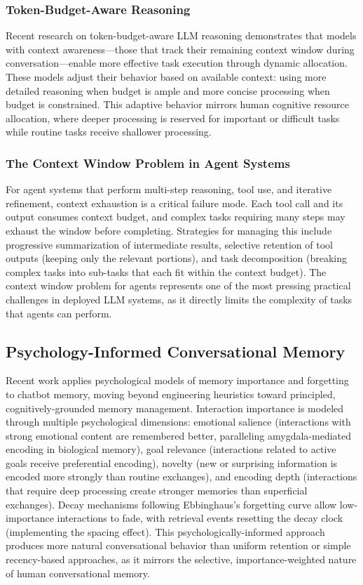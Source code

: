 \documentclass[11pt,letterpaper]{article}
\begin{document}
\subsubsection{Token-Budget-Aware Reasoning}

Recent research on token-budget-aware LLM reasoning demonstrates that models with context awareness---those that track their remaining context window during conversation---enable more effective task execution through dynamic allocation. These models adjust their behavior based on available context: using more detailed reasoning when budget is ample and more concise processing when budget is constrained. This adaptive behavior mirrors human cognitive resource allocation, where deeper processing is reserved for important or difficult tasks while routine tasks receive shallower processing.

\subsubsection{The Context Window Problem in Agent Systems}

For agent systems that perform multi-step reasoning, tool use, and iterative refinement, context exhaustion is a critical failure mode. Each tool call and its output consumes context budget, and complex tasks requiring many steps may exhaust the window before completing. Strategies for managing this include progressive summarization of intermediate results, selective retention of tool outputs (keeping only the relevant portions), and task decomposition (breaking complex tasks into sub-tasks that each fit within the context budget). The context window problem for agents represents one of the most pressing practical challenges in deployed LLM systems, as it directly limits the complexity of tasks that agents can perform.

\subsection{Psychology-Informed Conversational Memory}

Recent work applies psychological models of memory importance and forgetting to chatbot memory, moving beyond engineering heuristics toward principled, cognitively-grounded memory management. Interaction importance is modeled through multiple psychological dimensions: emotional salience (interactions with strong emotional content are remembered better, paralleling amygdala-mediated encoding in biological memory), goal relevance (interactions related to active goals receive preferential encoding), novelty (new or surprising information is encoded more strongly than routine exchanges), and encoding depth (interactions that require deep processing create stronger memories than superficial exchanges). Decay mechanisms following Ebbinghaus's forgetting curve allow low-importance interactions to fade, with retrieval events resetting the decay clock (implementing the spacing effect). This psychologically-informed approach produces more natural conversational behavior than uniform retention or simple recency-based approaches, as it mirrors the selective, importance-weighted nature of human conversational memory.
\end{document}
